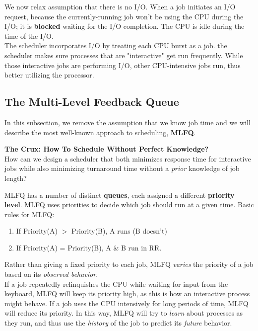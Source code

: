 We now relax assumption that there is no I/O. When a job initiates an I/O
request, because the currently-running job won't be using the CPU during the
I/O; it is \textbf{blocked} waiting for the I/O completion. The CPU is idle
during the time of the I/O.\\

The scheduler incorporates I/O by treating each CPU burst as a job. the
scheduler makes sure processes that are "interactive" get run frequently. While
those interactive jobs are performing I/O, other CPU-intensive jobs run, thus
better utilizing the processor.

\subsection{The Multi-Level Feedback Queue}

In this subsection, we remove the assumption that we know job time and 
we will describe the most well-known approach to
scheduling, \textbf{MLFQ}. \\

\begin{tcolorbox}
    \textbf{The Crux: How To Schedule Without Perfect Knowledge?}\\

    How can we design a scheduler that both minimizes response time for
    interactive jobs while also minimizing turnaround time without a
    \textit{prior} knowledge of job length?\\
\end{tcolorbox}

MLFQ has a number of distinct \textbf{queues}, each assigned a different 
\textbf{priority level}. MLFQ uses priorities to decide which job should run
at a given time. Basic rules for MLFQ:

\begin{enumerate}
    \item If Priority(A) $>$ Priority(B), A runs (B doesn't)
    \item If Priority(A) = Priority(B), A \& B run in RR.
\end{enumerate}

Rather than giving a fixed priority to each job, MLFQ \textit{varies} the
priority of a job based on its \textit{observed behavior}.\\

If a job repeatedly relinquishes the CPU while
waiting for input from the keyboard, 
MLFQ will keep its priority high, as this is how an interactive process might
behave. If a job uses the CPU intensively for long periods of time, MLFQ will
reduce its priority. In this way, MLFQ will try to \textit{learn} about 
processes as they run, and thus use the \textit{history} of the job to
predict its \textit{future} behavior.

